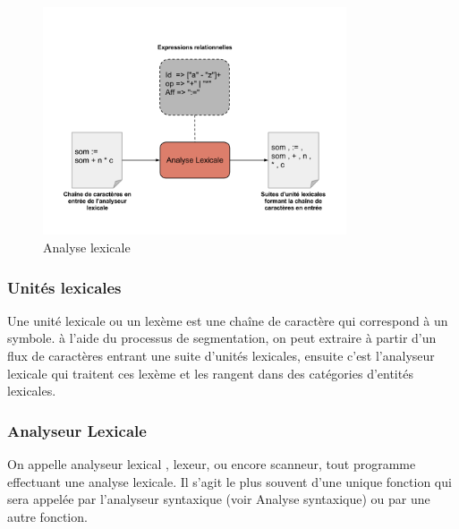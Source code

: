 \documentclass{article}
\begin{document}
\begin{figure}[h!]
	\centering
		\includegraphics[width=0.80\textwidth]{AnalyseLexicale.png}
	\caption{Analyse lexicale}
	\label{fig:AnalyseLexicale}
\end{figure}\FloatBarrier


\subsubsection{Unités lexicales}
Une unité lexicale ou un lexème est une chaîne de caractère qui correspond à un symbole. à l’aide du processus de segmentation, on peut extraire à partir d’un flux de caractères entrant une suite d’unités lexicales, ensuite c’est l’analyseur lexicale qui traitent ces lexème et les rangent dans des catégories d’entités lexicales.

\subsubsection{Analyseur Lexicale}

On appelle analyseur lexical \cite{refAnalyseurLexicale}, lexeur, ou encore scanneur, tout programme effectuant une analyse lexicale. Il s'agit le plus souvent d'une unique fonction qui sera appelée par l'analyseur syntaxique (voir Analyse syntaxique) ou par une autre fonction.
\end{document}
